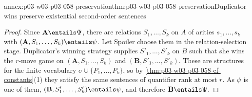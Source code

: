 \begin{annexitem}{annex:p03-w03-p03-058-preservation}{thm:p03-w03-p03-058-preservation}{Duplicator wins preserve existential second-order sentences}
\begin{proof}
Since \(\mathbf A\entails\Psi\), there are relations \(S_1,\ldots,S_k\) on
\(A\) of arities \(s_1,\ldots,s_k\) with
\((\mathbf A,S_1,\ldots,S_k)\entails\psi\). Let Spoiler choose them in the
relation-selection stage. Duplicator's winning strategy supplies
\(S'_1,\ldots,S'_k\) on \(B\) such that she wins the \(r\)-move game on
\((\mathbf A,S_1,\ldots,S_k)\) and \((\mathbf B,S'_1,\ldots,S'_k)\). These
are structures for the finite vocabulary \(\sigma\cup\{P_1,\ldots,P_k\}\),
so by \cref{thm:p03-w03-p03-058-ef-constants}(1) they satisfy the same
sentences of quantifier rank at most \(r\). As \(\psi\) is one of them,
\((\mathbf B,S'_1,\ldots,S'_k)\entails\psi\), and therefore
\(\mathbf B\entails\Psi\).
\end{proof}
\end{annexitem}

